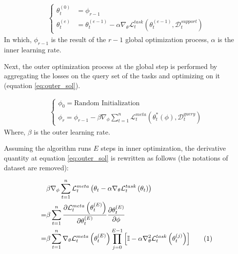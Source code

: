 \documentclass[aps,prb,groupedaddress,twocolumn,showpacs,dvipdfmx,superscriptaddress,pdftex]{revtex4-2}
\newcommand\numberthis{\addtocounter{equation}{1}\tag{\theequation}}
\begin{document}
\begin{align}
    \begin{cases}
        \theta_t^{(0)} &= \phi_{r-1} \\
        \theta_t^{(e)} &= \theta_t^{(e-1)} - \alpha \nabla_{\theta} \mathcal{L}^{task}_t\left( \theta_t^{(e-1)}, \mathcal{D}_t^{support} \right)
    \end{cases}
\end{align} In which, $\phi_{r-1}$ is the result of the $r-1$ global optimization process, $\alpha$ is the inner learning rate.

\vspace{2mm}


Next, the outer optimization process at the global step is performed by aggregating the losses on the query set of the tasks and optimizing on it (equation \ref{eq:outer_sol}).

\begin{align}
    \begin{cases}
        \phi_0 = \text{Random Initialization}\\
        \phi_r = \phi_{r-1} - \beta \nabla_{\phi} \sum_{t=1}^n{\mathcal{L}^{meta}_t \left( \theta_t^*(\phi), \mathcal{D}_t^{query} \right)}
    \end{cases}
    \label{eq:outer_sol}
\end{align} Where, $\beta$ is the outer learning rate.


Assuming the algorithm runs $E$ steps in inner optimization, the derivative quantity at equation \ref{eq:outer_sol} is rewritten as follows (the notations of dataset are removed):

\begin{align*}
    &\beta \nabla_{\phi} \sum_{t=1}^n{\mathcal{L}^{meta}_t \left( \theta_t - \alpha \nabla_{\theta} \mathcal{L}^{task}_t\left( \theta_t \right) \right)}\\
    = &\beta \sum_{t=1}^n{ \frac{\partial \mathcal{L}^{meta}_t\left(\theta_t^{(E)}\right)}{\partial \theta_t^{(E)}} \frac{\partial \theta_t^{(E)}}{\partial \phi}}\\
    = &\beta \sum_{t=1}^n{ \nabla_{\theta} \mathcal{L}^{meta}_t\left(\theta_t^{(E)}\right) \prod_{j=0}^{E-1} {\left[\mathbb{I} - \alpha\nabla^2_{\theta}\mathcal{L}^{task}_{t}\left(\theta_t^{(j)}\right)\right]}} \numberthis
    \label{eq:outer_sol_}
\end{align*}
\end{document}
